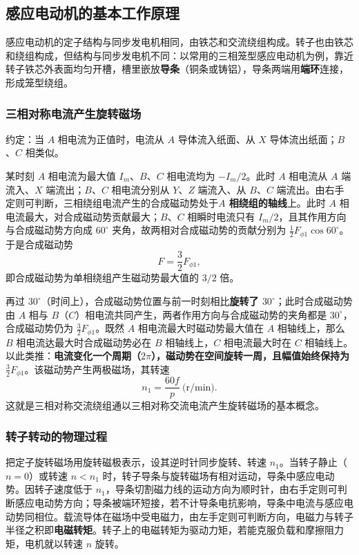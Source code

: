 \subsection{感应电动机的基本工作原理}
感应电动机的定子结构与同步发电机相同，由铁芯和交流绕组构成。转子也由铁芯和绕组构成，但结构与同步发电机不同：以常用的三相笼型感应电动机为例，靠近转子铁芯外表面均匀开槽，槽里嵌放\textbf{导条}（铜条或铸铝），导条两端用\textbf{端环}连接，形成笼型绕组。

\subsubsection{三相对称电流产生旋转磁场}
约定：当 $A$ 相电流为正值时，电流从 $A$ 导体流入纸面、从 $X$ 导体流出纸面；$B$、$C$ 相类似。

某时刻 $A$ 相电流为最大值 $I_m$、$B$、$C$ 相电流均为 $-I_m/2$。此时 $A$ 相电流从 $A$ 端流入、$X$ 端流出；$B$、$C$ 相电流分别从 $Y$、$Z$ 端流入、从 $B$、$C$ 端流出。由右手定则可判断，三相绕组电流产生的合成磁动势处于\textbf{$A$ 相绕组的轴线}上。此时 $A$ 相电流最大，对合成磁动势贡献最大；$B$、$C$ 相瞬时电流只有 $I_m/2$，且其作用方向与合成磁动势方向成 $60^\circ$ 夹角，故两相对合成磁动势的贡献分别为 $\tfrac12F_{\phi1}\cos60^\circ$。于是合成磁动势
\begin{equation}
F=\frac32F_{\phi1},
\end{equation}
即合成磁动势为单相绕组产生磁动势最大值的 $3/2$ 倍。

再过 $30^\circ$（时间上），合成磁动势位置与前一时刻相比\textbf{旋转了 $30^\circ$}；此时合成磁动势由 $A$ 相与 $B$（$C$）相电流共同产生，两者作用方向与合成磁动势的夹角都是 $30^\circ$，合成磁动势仍为 $\tfrac32F_{\phi1}$。既然 $A$ 相电流最大时磁动势最大值在 $A$ 相轴线上，那么 $B$ 相电流达最大时合成磁动势必在 $B$ 相轴线上，$C$ 相电流最大时在 $C$ 相轴线上。以此类推：\textbf{电流变化一个周期（$2\pi$），磁动势在空间旋转一周，且幅值始终保持为 $\tfrac32F_{\phi1}$}。该磁动势产生两极磁场，其转速
\begin{equation}
n_1=\frac{60f}{p}\ \text{(r/min)} .
\end{equation}
这就是三相对称交流绕组通以三相对称交流电流产生旋转磁场的基本概念。

\subsubsection{转子转动的物理过程}
把定子旋转磁场用旋转磁极表示，设其逆时针同步旋转、转速 $n_1$。当转子静止（$n=0$）或转速 $n<n_1$ 时，转子导条与旋转磁场有相对运动，导条中感应电动势。因转子速度低于 $n_1$，导条切割磁力线的运动方向为顺时针，由右手定则可判断感应电动势方向；导条被端环短接，若不计导条电抗影响，导条中电流与感应电动势同相位。载流导体在磁场中受电磁力，由左手定则可判断方向，电磁力与转子半径之积即\textbf{电磁转矩}。转子上的电磁转矩为驱动力矩，若能克服负载和摩擦阻力矩，电机就以转速 $n$ 旋转。

